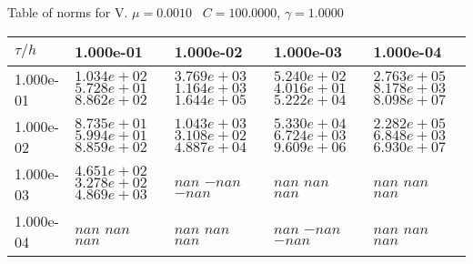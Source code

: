 \begin{center}
Table of norms for V. $\mu = 0.0010$ \, $C = 100.0000$, $\gamma = 1.0000$
  
\begin{tabular}{|p{1in}|p{1in}|p{1in}|p{1in}|p{1in}|} \hline
$\tau / h$ &1.000e-01 &1.000e-02 &1.000e-03 &1.000e-04 \\ \hline 
1.000e-01 & $1.034e+02$  $5.728e+01$  $8.862e+02$  & $3.769e+03$  $1.164e+03$  $1.644e+05$  & $5.240e+02$  $4.016e+01$  $5.222e+04$  & $2.763e+05$  $8.178e+03$  $8.098e+07$  \\ \hline 
1.000e-02 & $8.735e+01$  $5.994e+01$  $8.859e+02$  & $1.043e+03$  $3.108e+02$  $4.887e+04$  & $5.330e+04$  $6.724e+03$  $9.609e+06$  & $2.282e+05$  $6.848e+03$  $6.930e+07$  \\ \hline 
1.000e-03 & $4.651e+02$  $3.278e+02$  $4.869e+03$  & $nan$  $-nan$  $-nan$  & $nan$  $nan$  $nan$  & $nan$  $nan$  $nan$  \\ \hline 
1.000e-04 & $nan$  $nan$  $nan$  & $nan$  $nan$  $nan$  & $nan$  $-nan$  $-nan$  & $nan$  $nan$  $nan$  \\ \hline 

\end{tabular}\\[20pt]
\end{center}

